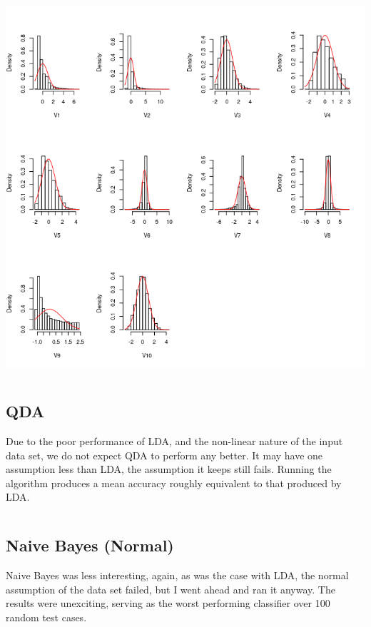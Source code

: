 \documentclass{jhwhw}
\begin{document}
    \clearpage
    \inputminted[frame=lines,framesep=2mm]{text}{g.norm.txt}
    \begin{center}
	\includegraphics[scale=0.5]{ghist}
    \end{center}

    \clearpage
    \inputminted[linenos,frame=lines,framesep=2mm]{R}{lda.R}

    \subsection*{QDA}
    Due to the poor performance of LDA, and the non-linear nature of the input data set,
    we do not expect QDA to perform any better.
    It may have one assumption less than LDA, the assumption it keeps still fails.
    Running the algorithm produces a mean accuracy roughly equivalent to that 
    produced by LDA. \\
    \inputminted[linenos,frame=lines,framesep=2mm]{R}{qda.R}

    \subsection*{Naive Bayes (Normal)}
    Naive Bayes was less interesting, again, as was the case with LDA, the normal 
    assumption of the data set failed, but I went ahead and ran it anyway.
    The results were unexciting, serving as the worst performing classifier
    over 100 random test cases. \\
    \inputminted[linenos,frame=lines,framesep=2mm]{R}{bayes_norm.R}
\end{document}
